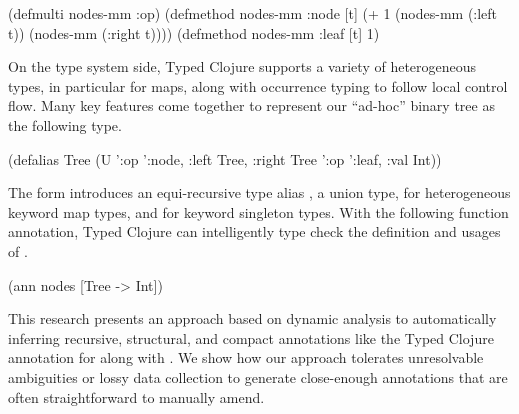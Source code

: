 \begin{cljlisting}
(defmulti nodes-mm :op)
(defmethod nodes-mm :node [t] (+ 1 (nodes-mm (:left t)) (nodes-mm (:right t))))
(defmethod nodes-mm :leaf [t] 1)
\end{cljlisting}

On the type system side, Typed Clojure supports a variety of heterogeneous types,
in particular for maps, along with occurrence typing \cite{TF10} to follow local control flow.
Many key features come together to represent our ``ad-hoc'' binary tree as the following type.

\begin{cljlisting}
(defalias Tree
  (U '{:op ':node, :left Tree, :right Tree}
     '{:op ':leaf, :val Int}))
\end{cljlisting}

The  form introduces an equi-recursive type alias ,
 a union type,  for heterogeneous keyword map types,
and  for keyword singleton types.
With the following function annotation, Typed Clojure can intelligently type check
the definition and usages of .

\begin{cljlisting}
(ann nodes [Tree -> Int])
\end{cljlisting}

This research presents an approach based on dynamic analysis to automatically inferring 
recursive, structural, and compact annotations
like the Typed Clojure annotation for  along with .
We show how our approach tolerates unresolvable ambiguities or lossy data collection
to generate close-enough annotations that are often straightforward to manually amend.


